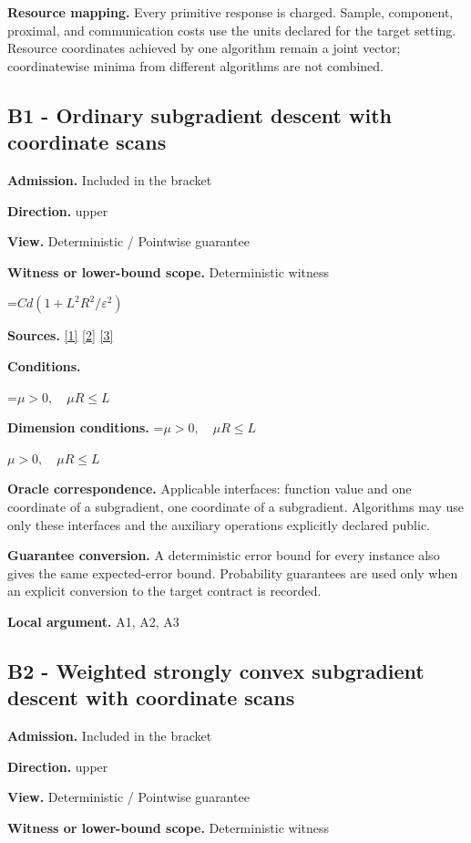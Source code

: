 \documentclass[10pt,a4paper]{article}
\newcommand{\AtlasMath}[1]{\par\begingroup\centering\setbox0=\hbox{$\displaystyle #1$}\ifdim\wd0>1.4\linewidth\typeout{ATLAS WIDE FORMULA: \the\wd0}\fi\ifdim\wd0>\linewidth\resizebox{\linewidth}{!}{\box0}\else\box0\fi\par\endgroup}
\newcommand{\AtlasInlineMath}[1]{\begingroup\setbox0=\hbox{$#1$}\ifdim\wd0>.4\linewidth\endgroup\AtlasMath{#1}\else\endgroup$#1$\fi}
\begin{document}
\textbf{Resource mapping.} Every primitive response is charged. Sample, component, proximal, and communication costs use the units declared for the target setting. Resource coordinates achieved by one algorithm remain a joint vector; coordinatewise minima from different algorithms are not combined.

\subsection{B1 - Ordinary subgradient descent with coordinate scans}
\textbf{Admission.} Included in the bracket

\textbf{Direction.} upper

\textbf{View.} Deterministic / Pointwise guarantee

\textbf{Witness or lower-bound scope.} Deterministic witness

\AtlasMath{Cd(1+L^2R^2/\varepsilon^2)}
\textbf{Sources.} \href{https://arxiv.org/pdf/1405.4980}{[1]} \href{https://www2.isye.gatech.edu/~nemirovs/MOR_AccuracyCertificates.pdf}{[2]} \href{https://arxiv.org/pdf/2609.20701}{[3]}

\textbf{Conditions.} 
\AtlasMath{\mu>0,\quad\mu R\le L}


\textbf{Dimension conditions.} \AtlasInlineMath{\mu>0,\quad\mu R\le L}

\textbf{Oracle correspondence.} Applicable interfaces: function value and one coordinate of a subgradient, one coordinate of a subgradient. Algorithms may use only these interfaces and the auxiliary operations explicitly declared public.

\textbf{Guarantee conversion.} A deterministic error bound for every instance also gives the same expected-error bound. Probability guarantees are used only when an explicit conversion to the target contract is recorded.

\textbf{Local argument.} A1, A2, A3

\subsection{B2 - Weighted strongly convex subgradient descent with coordinate scans}
\textbf{Admission.} Included in the bracket

\textbf{Direction.} upper

\textbf{View.} Deterministic / Pointwise guarantee

\textbf{Witness or lower-bound scope.} Deterministic witness
\end{document}
